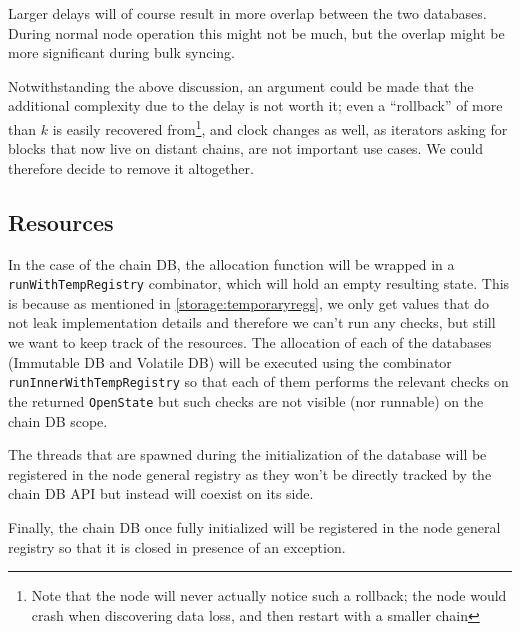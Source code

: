 Larger delays will of course result in more overlap between the two databases.
During normal node operation this might not be much, but the overlap might be
more significant during bulk syncing.

Notwithstanding the above discussion, an argument could be made that the
additional complexity due to the delay is not worth it; even a ``rollback'' of
more than $k$ is easily recovered from\footnote{Note that the node will never
actually notice such a rollback; the node would crash when discovering data
loss, and then restart with a smaller chain}, and clock changes as well, as
iterators asking for blocks that now live on distant chains, are not important
use cases. We could therefore decide to remove it altogether.

\subsection{Resources}
\label{chaindb:resources}

In the case of the chain DB, the allocation function will be wrapped in a
\lstinline!runWithTempRegistry! combinator, which will hold an empty resulting
state. This is because as mentioned in \ref{storage:temporaryregs}, we only get
values that do not leak implementation details and therefore we can't run any
checks, but still we want to keep track of the resources. The allocation of each
of the databases (Immutable DB and Volatile DB) will be executed using the
combinator \lstinline!runInnerWithTempRegistry! so that each of them performs
the relevant checks on the returned \lstinline!OpenState! but such checks are
not visible (nor runnable) on the chain DB scope.

The threads that are spawned during the initialization of the database will be
registered in the node general registry as they won't be directly tracked by the
chain DB API but instead will coexist on its side.

Finally, the chain DB once fully initialized will be registered in the node
general registry so that it is closed in presence of an exception.
